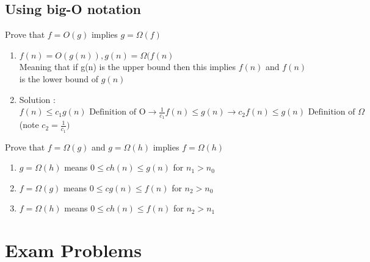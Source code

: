 \documentclass[11pt,fleqn]{book}
\begin{document}
\subsection{Using big-O notation}
\begin{example}
 Prove that $f = O(g)$ implies $g = \Omega(f)$
\end{example}
\begin{enumerate}
    \item $f(n) = O(g(n)), g(n) = \Omega(f(n)$\\ Meaning that if g(n) is the upper bound then this implies $f(n)$ and $f(n)$ is the lower bound of $g(n)$ 
    \item \color{blue} Solution : $f(n) \leq c_1 g(n) \text{ Definition of O} \rightarrow \frac{1}{c_1} f(n) \leq g(n) \rightarrow c_2 f(n) \leq g(n) \text{ Definition of } \Omega$\\ (note $c_2 = \frac{1}{c_1})$\color{black} 
\end{enumerate}
\begin{example}
Prove that $f = \Omega(g)$ and $g = \Omega(h)$ implies $f = \Omega(h)$ 
\end{example}
\begin{enumerate}
    \item $g = \Omega(h)$ means $0 \leq ch(n) \leq g(n)$ for $n_1 > n_0$
    \item $f = \Omega(g)$ means $0 \leq cg(n) \leq f(n)$ for $n_2 > n_0$
    \item $f = \Omega(h)$ means $0 \leq ch(n) \leq f(n)$ for $n_2 > n_1$
\end{enumerate}
\section{Exam Problems} 
\end{document}
